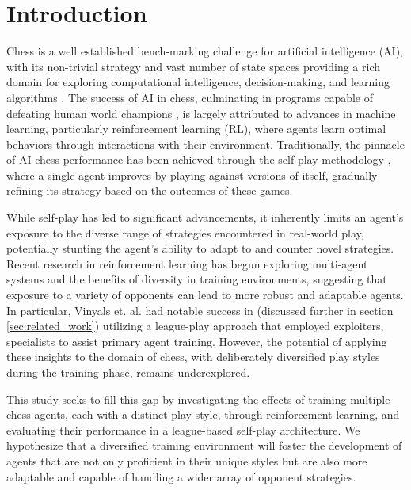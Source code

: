 \documentclass[journal]{IEEEtran}
\begin{document}
	\section{Introduction}
	\label{sec:introduction}
	Chess is a well established bench-marking challenge for artificial intelligence (AI),
	with its non-trivial strategy and vast number of state spaces providing a rich domain for exploring 
	computational intelligence, decision-making, and learning algorithms 
	\cite{silver2017, silver2017a, schrittwieser2020, 
	campbell2002, lai2015, hammersborg2023,bertram2022}.
	The success of AI in chess, culminating in programs capable of defeating human world champions
	\cite{campbell2002}, 
	is largely attributed to advances in machine learning, particularly reinforcement learning (RL), 
	where agents learn optimal behaviors through interactions with their environment. 
	Traditionally, the pinnacle of AI chess performance has been achieved through the self-play methodology
	\cite{silver2017, silver2017a}, 
	where a single agent improves by playing against versions of itself, gradually refining its strategy based on the outcomes of these games.
	
	While self-play has led to significant advancements, it inherently limits an agent's exposure to the diverse range of strategies 
	encountered in real-world play, potentially stunting the agent's ability to adapt to and counter novel strategies. 
	Recent research in reinforcement learning has begun exploring multi-agent systems and the benefits of diversity in training environments, 
	suggesting that exposure to a variety of opponents can lead to more robust and adaptable agents.
	In particular, Vinyals et. al.  had notable success in \cite{vinyals2019} (discussed further in section \ref{sec:related_work})
	utilizing a league-play approach that employed exploiters, specialists to assist primary agent training. 
	However, the potential of applying these insights to the domain of chess, 
	with deliberately diversified play styles during the training phase, remains underexplored.
	\begin{comment}
		I don't love this sentence, I think it implies too much that this is about chess in particular
	\end{comment}
	
	This study seeks to fill this gap by investigating the effects of training multiple chess agents, each with a distinct play style, 
	through reinforcement learning, and evaluating their performance in a league-based self-play architecture. 
	We hypothesize that a diversified training environment will foster the development of agents that are not only 
	proficient in their unique styles but are also more adaptable and capable of handling a wider array of opponent strategies. 
	
\end{document}

